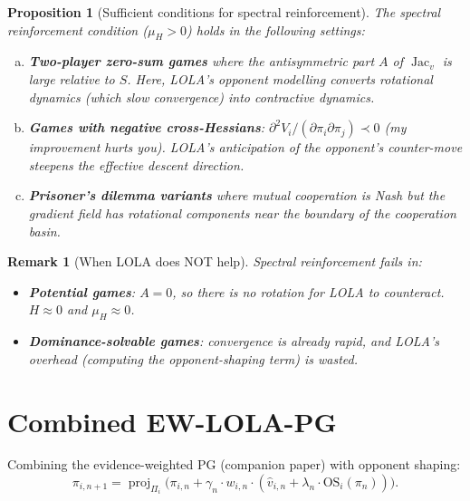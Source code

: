 \documentclass[11pt,a4paper]{article}
\newtheorem{proposition}[theorem]{Proposition}
\newtheorem{remark}[theorem]{Remark}
\DeclareMathOperator{\proj}{proj}
\DeclareMathOperator{\Jac}{Jac}
\begin{document}
\begin{proposition}[Sufficient conditions for spectral reinforcement]
\label{prop:sufficient}
The spectral reinforcement condition ($\mu_H > 0$) holds in the following settings:
\begin{enumerate}[(a)]
    \item \textbf{Two-player zero-sum games} where the antisymmetric part $A$ of $\Jac_v$ is large relative to $S$. Here, LOLA's opponent modelling converts rotational dynamics (which slow convergence) into contractive dynamics.

    \item \textbf{Games with negative cross-Hessians}: $\partial^2 V_i / (\partial \pi_i \partial \pi_j) \prec 0$ (my improvement hurts you). LOLA's anticipation of the opponent's counter-move steepens the effective descent direction.

    \item \textbf{Prisoner's dilemma variants} where mutual cooperation is Nash but the gradient field has rotational components near the boundary of the cooperation basin.
\end{enumerate}
\end{proposition}

\begin{remark}[When LOLA does NOT help]
Spectral reinforcement fails in:
\begin{itemize}
    \item \textbf{Potential games}: $A = 0$, so there is no rotation for LOLA to counteract. $H \approx 0$ and $\mu_H \approx 0$.
    \item \textbf{Dominance-solvable games}: convergence is already rapid, and LOLA's overhead (computing the opponent-shaping term) is wasted.
\end{itemize}
\end{remark}


\section{Combined EW-LOLA-PG}
\label{sec:combined}

Combining the evidence-weighted PG (companion paper) with opponent shaping:
\begin{equation}
\label{eq:ew-lola}
\tag{EW-LOLA-PG}
    \pi_{i,n+1} = \proj_{\Pi_i}\bigl(\pi_{i,n} + \gamma_n \cdot w_{i,n} \cdot (\hat{v}_{i,n} + \lambda_n \cdot \mathrm{OS}_i(\pi_n))\bigr).
\end{equation}
\end{document}
